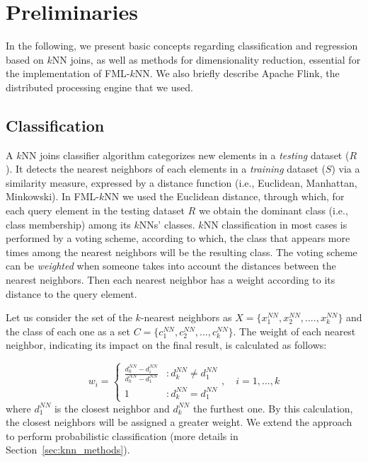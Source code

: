 
\section{Preliminaries}
\label{sec:knn_prelim}

\graphicspath{{Papers/SpringerJournalOfBigData/}}

In the following, we present basic concepts regarding classification and regression based on $k$NN joins, as well as methods for dimensionality reduction, essential for the implementation of FML-$k$NN. We also briefly describe Apache Flink, the distributed processing engine that we used.

\subsection{Classification}
\label{subsec:classification}
A $k$NN joins classifier algorithm categorizes new elements in a \textit{testing} dataset ($R$). It detects the nearest neighbors of each elements in a \textit{training} dataset ($S$) via a similarity measure, expressed by a distance function (i.e., Euclidean, Manhattan, Minkowski). In FML-$k$NN we used the Euclidean distance, through which, for each query element in the testing dataset $R$ we obtain the dominant class (i.e., class membership) among its $k$NNs' classes. $k$NN classification in most cases is performed by a voting scheme, according to which, the class that appears more times among the nearest neighbors will be the resulting class. The voting scheme can be \textit{weighted} when someone takes into account the distances between the nearest neighbors. Then each nearest neighbor has a weight according to its distance to the query element.

Let us consider the set of the $k$-nearest neighbors as $X = \{x_{1}^{NN}, x_{2}^{NN}, ...., x_{k}^{NN}\}$ and the class of each one as a set $C = \{c_{1}^{NN}, c_{2}^{NN}, ..., c_{k}^{NN}\}$. The weight of each nearest neighbor, indicating its impact on the final result, is calculated as follows:

\begin{equation}
	w_{i} = \left\{
		\begin{array}{lr}
			\frac{d_{k}^{NN} - d_{i}^{NN}}{d_{k}^{NN} - d_{1}^{NN}} & : d_{k}^{NN} \neq d_{1}^{NN}\\
			1 & : d_{k}^{NN} = d_{1}^{NN}
		\end{array}
	\right., \quad i=1, ..., k
\end{equation}
where $d_{1}^{NN}$ is the closest neighbor and $d_{k}^{NN}$ the furthest one. By this calculation, the closest neighbors will be assigned a greater weight. We extend the approach to perform probabilistic classification (more details in Section~\ref{sec:knn_methods}).

